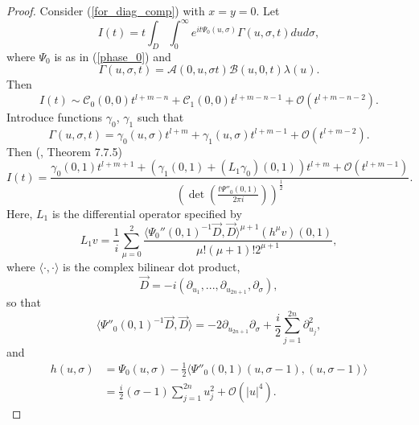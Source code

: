 \documentclass{article}
\newcommand{\mca}{\mathcal A}
\newcommand{\mcb}{\mathcal B}
\newcommand{\mcc}{\mathcal C}
\newcommand{\mco}{\mathcal O}
\begin{document}
%
\begin{proof}
Consider (\ref{for_diag_comp}) with $x = y= 0$. Let
%
%
\begin{equation*} I(t) = t\int_D \int_0^\infty e^{i t \Psi_0(u, \sigma)} \Gamma(u, \sigma, t) du d\sigma,\end{equation*}
where $\Psi_0$ is as in (\ref{phase_0}) and
\begin{equation*} \Gamma(u, \sigma, t) = \mca(0, u, \sigma t) \mcb(u, 0, t)\lambda(u).\end{equation*}
Then
%
\begin{equation*} I(t) \sim \mcc_0(0,0) t^{l+m-n} + \mcc_1(0,0) t^{l+m-n-1} + \mco(t^{l+m-n-2}).\end{equation*}
Introduce functions $\gamma_0$, $\gamma_1$ such that $$\Gamma(u, \sigma, t) = \gamma_0(u, \sigma) t^{l+m} + \gamma_1(u, \sigma)t^{l+m-1} + \mco(t^{l+m-2}).$$
Then (\cite{hormander1}, Theorem 7.7.5)
\begin{equation*} I(t) = \frac{ \gamma_0(0,1)t^{l+m+1} + \left(\gamma_1(0,1) + (L_1 \gamma_0)(0,1)\right)t^{l+m} + \mco(t^{l+m-1})}{ \left(\det\left(\frac{t \Psi''_0(0,1)}{2\pi i} \right) \right)^{\frac 1 2}}.\end{equation*}
%
%
Here, $L_1$ is the differential operator specified by
\begin{equation*} L_1 v = \frac 1 i \sum_{\mu=0}^2 \frac{\langle \Psi_0''(0,1)^{-1} \vec D, \vec D \rangle^{\mu+1} (h^\mu v)(0,1)}{\mu! (\mu+1)! 2^{\mu + 1}},\end{equation*}
where $\langle \cdot, \cdot \rangle$ is the complex bilinear dot product,
$$\vec D = -i(\partial_{u_1}, ..., \partial_{u_{2n+1}}, \partial_\sigma),$$ so that
\begin{equation*} \langle \Psi''_0(0,1)^{-1} \vec D, \vec D\rangle = -2 \partial_{u_{2n+1}} \partial_\sigma  + \frac i {2} \sum_{j=1}^{2n} \partial_{u_{j}}^2,\end{equation*}
and 
\begin{equation*} \begin{aligned} h(u, \sigma) &= \Psi_0(u, \sigma) - \frac 1 2 \langle \Psi''_0(0,1)(u, \sigma-1), (u, \sigma-1) \rangle\\ &= \frac i 2 (\sigma-1) \sum_{j=1}^{2n} u_{j}^2 + \mco(|u|^4).\end{aligned}\end{equation*}


\end{proof}
\end{document}
